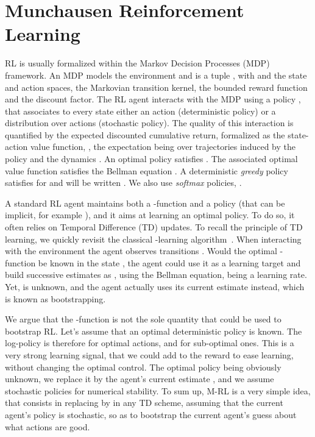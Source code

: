 \documentclass{article}
\begin{document}
\section{Munchausen Reinforcement Learning \label{sec:mrl}}

RL is usually formalized within the Markov Decision Processes (MDP) framework. An MDP models the environment and is a tuple , with  and  the state and action spaces,  the Markovian transition kernel,  the bounded reward function and  the discount factor.  The RL agent interacts with the MDP using a policy , that associates to every state either an action (deterministic policy) or a distribution over actions (stochastic policy). The quality of this interaction is quantified by the expected discounted cumulative return, formalized as the state-action value function, , the expectation being over trajectories induced by the policy  and the dynamics . An optimal policy satisfies . The associated optimal value function  satisfies the Bellman equation . A deterministic \textit{greedy} policy satisfies  for 
and will be written . We also use \textit{softmax} policies, .

A standard RL agent maintains both a -function and a policy (that can be implicit, for example ), and it aims at learning an optimal policy. To do so, it often relies on Temporal Difference (TD) updates. To recall the principle of TD learning, we quickly revisit the classical -learning algorithm~\cite{watkins1992q}. When interacting with the environment the agent observes transitions . Would the optimal -function  be known in the state , the agent could use it as a learning target and build successive estimates as , using the Bellman equation,  being a learning rate. Yet,  is unknown, and the agent actually uses its current estimate  instead, which is known as bootstrapping. 

We argue that the -function is not the sole quantity that could be used to bootstrap RL. Let's assume that an optimal deterministic policy  is known. The log-policy is therefore  for optimal actions, and  for sub-optimal ones. This is a very strong learning signal, that we could add to the reward to ease learning, without changing the optimal control. The optimal policy  being obviously unknown, we replace it by the agent's current estimate , and we assume stochastic policies for numerical stability. To sum up, M-RL is a very simple idea, that consists in replacing  by  in any TD scheme, assuming that the current agent's policy  is stochastic, so as to bootstrap the current agent's guess about what actions are good.
\end{document}

